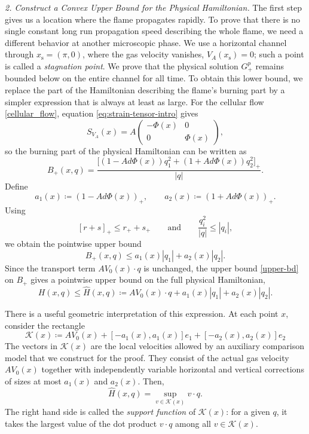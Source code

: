 \documentclass[11pt,reqno,noamsfonts]{amsart}
\theoremstyle{definition}
\theoremstyle{remark}
\begin{document}
\textit{2. Construct a Convex Upper Bound for the Physical Hamiltonian.}
The first step gives us a location where the flame propagates rapidly.
To prove that there is no single constant long run propagation speed
describing the whole flame, we need a different behavior at another
microscopic phase.  We use a horizontal channel through
$x_{\mathrm s}=(\pi,0)$, where the gas velocity vanishes,
$V_A(x_{\mathrm s})=0$; such a point is called a \emph{stagnation
point}.  We prove that the physical solution $G_+^p$ remains bounded
below on the entire channel for all time. To obtain this lower bound, we replace the part of the Hamiltonian
describing the flame's burning part by a simpler expression that
is always at least as large.
For the cellular flow \eqref{cellular_flow}, equation  \eqref{eq:strain-tensor-intro} gives
\[
  S_{V_A}(x)
  =
  A
  \begin{pmatrix}
    -\Phi(x)&0\\
    0&\Phi(x)
  \end{pmatrix},
\]
so the burning part of the physical Hamiltonian can be written as
\[
  B_+(x,q)
  =
  \frac{
    \bigl[
      (1-Ad\Phi(x))q_1^2
      +(1+Ad\Phi(x))q_2^2
    \bigr]_+
  }{|q|}.
\]
Define
\[
  a_1(x)\coloneqq (1-Ad\Phi(x))_+,
  \qquad
  a_2(x)\coloneqq (1+Ad\Phi(x))_+.
\]
Using
\[
  [r+s]_+\le r_++s_+
  \qquad\text{and}\qquad
  \frac{q_i^2}{|q|}\le |q_i|,
\]
we obtain the pointwise upper bound
\begin{equation}\label{upper-bd}
    B_+(x,q)
  \le
  a_1(x)|q_1|+a_2(x)|q_2|.
\end{equation}
Since the transport term $A V_0(x)\cdot q$ is unchanged, the upper bound \eqref{upper-bd} on $B_+$ gives a pointwise upper bound on the full physical
Hamiltonian,
\[
  H(x,q)\le \widehat H(x,q)\coloneqq 
  A V_0(x)\cdot q
  +a_1(x)|q_1|
  +a_2(x)|q_2|.
\]

There is a useful geometric interpretation of this expression.  At each
point $x$, consider the rectangle
\[
  \mathcal K(x)
  \coloneqq 
  A V_0(x)
  +[-a_1(x),a_1(x)]e_1
  +[-a_2(x),a_2(x)]e_2
\]
The vectors in $\mathcal K(x)$ are the local velocities allowed by an
auxiliary comparison model that we construct for the proof. They consist
of the actual gas velocity $A V_0(x)$ together with independently
variable horizontal and vertical corrections of sizes at most $a_1(x)$
and $a_2(x)$. Then,
\[
  \widehat H(x,q)
  =
  \sup_{v\in\mathcal K(x)} v\cdot q.
\]
The right hand side is called the \emph{support function} of
$\mathcal K(x)$: for a given $q$, it takes the largest value of the dot
product $v\cdot q$ among all $v\in\mathcal K(x)$.
\end{document}
